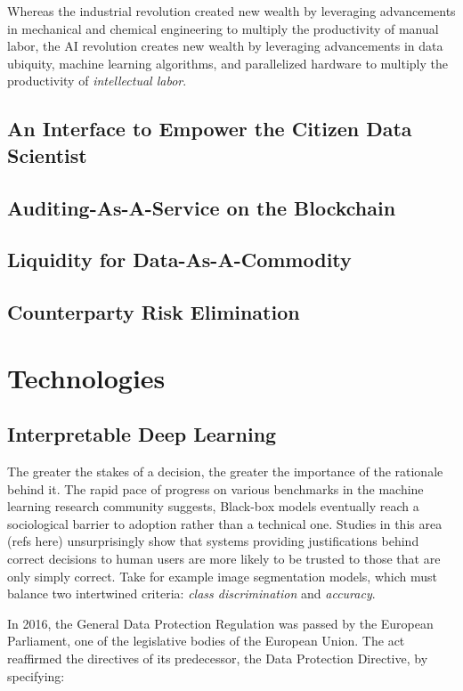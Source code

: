 \documentclass[12pt]{article}
\begin{document}
Whereas the industrial revolution created new wealth by leveraging advancements in mechanical and chemical engineering to multiply the productivity of manual labor, the AI revolution creates new wealth by leveraging advancements in data ubiquity, machine learning algorithms, and parallelized hardware to multiply the productivity of \emph{intellectual labor}.

\subsection{An Interface to Empower the Citizen Data Scientist}

\subsection{Auditing-As-A-Service on the Blockchain}

\subsection{Liquidity for Data-As-A-Commodity}

\subsection{Counterparty Risk Elimination}

\section{Technologies}

\subsection{Interpretable Deep Learning}
The greater the stakes of a decision, the greater the importance of the rationale behind it.  The rapid pace of progress on various benchmarks in the machine learning research community suggests, Black-box models eventually reach a sociological barrier to adoption rather than a technical one.  Studies in this area (refs here) unsurprisingly show that systems providing justifications behind correct decisions to human users are more likely to be trusted to those that are only simply correct.  Take for example image segmentation models, which must balance two intertwined criteria: \emph{class discrimination} and \emph{accuracy}.

In 2016, the General Data Protection Regulation was passed by the European Parliament, one of the legislative bodies of the European Union.  The act reaffirmed the directives of its predecessor, the Data Protection Directive, by specifying:
\end{document}
